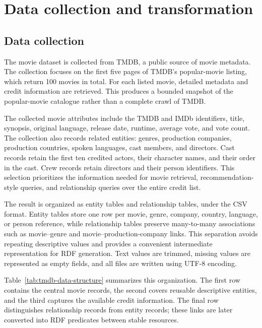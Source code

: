 \section{Data collection and transformation}\label{sec:data}
\subsection{Data collection}

The movie dataset is collected from TMDB, a public
source of movie metadata. The collection focuses on the first five pages of
TMDB's popular-movie listing, which return 100 movies in total. 
For each listed movie, detailed metadata and
credit information are retrieved. This produces a bounded snapshot of the
popular-movie catalogue rather than a complete crawl of TMDB.

The collected movie attributes include the TMDB and IMDb identifiers, title,
synopsis, original language, release date, runtime, average vote, and vote
count. The collection also records related entities: genres, production
companies, production countries, spoken languages, cast members, and
directors. Cast records retain the first ten credited actors, their character
names, and their order in the cast. Crew records retain directors and their
person identifiers. This selection prioritizes the information needed for
movie retrieval, recommendation-style queries, and relationship queries over
the entire credit list.

The result is organized as entity tables and relationship tables, under the CSV format. Entity
tables store one row per movie, genre, company, country, language, or person
reference, while relationship tables preserve many-to-many associations such
as movie--genre and movie--production-company links. This separation avoids
repeating descriptive values and provides a convenient intermediate
representation for RDF generation. Text values are trimmed, missing values
are represented as empty fields, and all files are written using UTF-8
encoding.

Table~\ref{tab:tmdb-data-structure} summarizes this organization. The first
row contains the central movie records, the second covers reusable
descriptive entities, and the third captures the available credit
information. The final row distinguishes relationship records from entity
records; these links are later converted into RDF predicates between stable
resources.

